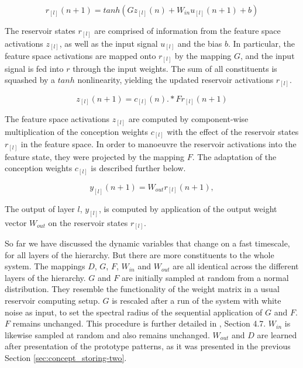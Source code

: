 \documentclass{frontiersSCNS} %
\begin{document}
    \begin{equation}
    r_{[l]} (n + 1) =  tanh(G z_{[l]} (n) + W_{in} u_{[l]} (n + 1) + b)
    \end{equation}
    
    The reservoir states $ r_{[l]} $ are comprised of information from the feature space activations $z_{[l]}$, as well as the input signal $u_{[l]}$ and the bias $b$. In particular, the feature space activations are mapped onto $ r_{[l]} $ by the mapping $G$, and the input signal is fed into $r$ through the input weights. The sum of all constituents is squashed by a $tanh$ nonlinearity, yielding the updated reservoir activations $r_{[l]}$. 
    
    \begin{equation}
    z_{[l]} (n + 1) =   c_{[l]} (n) .* F r_{[l]} (n + 1)
    \end{equation}
    
    The feature space activations $z_{[l]}$ are computed by component-wise multiplication of the conception weights $c_{[l]}$ with the effect of the reservoir states $r_{[l]}$ in the feature space. In order to manoeuvre the reservoir activations into the feature state, they were projected by the mapping $F$. The adaptation of the conception weights $c_{[l]}$ is described further below. 
    
    \begin{equation}
    y_{[l]} (n + 1) =     W_{out} r_{[l]} (n + 1),
    \end{equation}
    
    The output of layer $l$, $y_{[l]}$, is computed by application of the output weight vector $W_{out}$ on the reservoir states $r_{[l]}$.
    
    So far we have discussed the dynamic variables that change on a fast timescale, for all layers of the hierarchy. But there are more constituents to the whole system. The mappings $D$, $G$, $F$, $W_{in}$ and $W_{out}$ are all identical across the different layers of the hierarchy. $G$ and $F$ are initially sampled at random from a normal distribution. They resemble the functionality of the weight matrix in a usual reservoir computing setup. $G$ is rescaled after a run of the system with white noise as input, to set the spectral radius of the sequential application of $G$ and $F$. $F$ remains unchanged. This procedure is further detailed in \cite{Jaeger2014}, Section 4.7. $W_{in}$ is likewise sampled at random and also remains unchanged.
    $W_{out}$ and $D$ are learned after presentation of the prototype patterns, as it was presented in the previous Section \ref{sec:concept_storing-two}.
    
\end{document}
